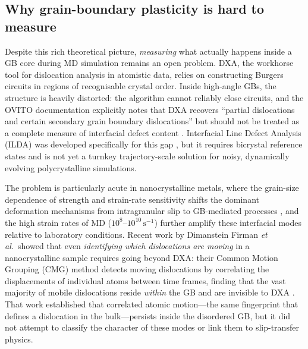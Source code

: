 \documentclass[11pt]{article}
\begin{document}
\subsection*{Why grain-boundary plasticity is hard to measure}
Despite this rich theoretical picture, \emph{measuring} what actually happens inside a GB core during MD simulation remains an open problem.
DXA, the workhorse tool for dislocation analysis in atomistic data, relies on constructing Burgers circuits in regions of recognisable crystal order.
Inside high-angle GBs, the structure is heavily distorted: the algorithm cannot reliably close circuits, and the OVITO documentation explicitly notes that DXA recovers ``partial dislocations and certain secondary grain boundary dislocations'' but should not be treated as a complete measure of interfacial defect content \cite{OVITODXA}.
Interfacial Line Defect Analysis (ILDA) was developed specifically for this gap \cite{Deka2023}, but it requires bicrystal reference states and is not yet a turnkey trajectory-scale solution for noisy, dynamically evolving polycrystalline simulations.

The problem is particularly acute in nanocrystalline metals, where the grain-size dependence of strength and strain-rate sensitivity shifts the dominant deformation mechanisms from intragranular slip to GB-mediated processes \cite{Huang2019}, and the high strain rates of MD ($10^{8}$--$10^{10}\,\mathrm{s^{-1}}$) further amplify these interfacial modes relative to laboratory conditions.
Recent work by Dimanstein Firman \emph{et al.}\ showed that even \emph{identifying which dislocations are moving} in a nanocrystalline sample requires going beyond DXA: their Common Motion Grouping (CMG) method detects moving dislocations by correlating the displacements of individual atoms between time frames, finding that the vast majority of mobile dislocations reside \emph{within} the GB and are invisible to DXA \cite{Firman2024}.
That work established that correlated atomic motion---the same fingerprint that defines a dislocation in the bulk---persists inside the disordered GB, but it did not attempt to classify the character of these modes or link them to slip-transfer physics.
\end{document}
